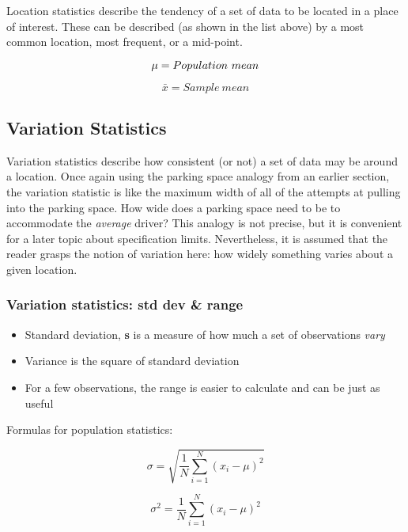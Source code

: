 Location statistics describe the tendency of a set of data to be located in a place of interest.  These can be described (as shown in the list above) by a most common location, most frequent, or a mid-point.\\


\begin{equation} \mu \index{mean} = Population \  mean\end{equation}

\begin{equation} \bar{x} =  Sample \  mean\end{equation}


\subsection{Variation Statistics}

Variation statistics describe how consistent (or not) a set of data may be around a location.  Once again using the parking space analogy from an earlier section, the variation statistic is like the maximum width of all of the attempts at pulling into the parking space.  How wide does a parking space need to be to accommodate the \textsl{average} driver?  This analogy is not precise, but it is convenient for a later topic about specification limits.  Nevertheless, it is assumed that the reader grasps the notion of variation here: how widely something varies about a given location.

\subsubsection{Variation statistics: std dev \& range}
  \begin{itemize}
  \item Standard deviation, \textbf{s}   is a measure of how much a set of observations \textsl{vary}
  \item Variance is the square of standard deviation
  \item For a few observations, the range is easier to calculate and can be just as useful
  \end{itemize}
  
  
Formulas for population statistics:\\

\begin{center}
\begin{equation}
\sigma = \sqrt{\frac{1}{N}\displaystyle\sum_{i=1}^{N}{\left( x_{i}-\mu\right)}^2 }
\end{equation}

\begin{equation}
\sigma^{2} = {\frac{1}{N}\displaystyle\sum_{i=1}^{N}{\left( x_{i}-\mu\right)}^2 }
\end{equation}
\end{center}

